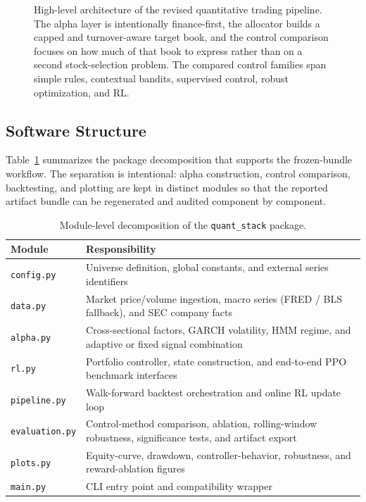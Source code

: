 \documentclass[10pt,twocolumn]{article}
\begin{document}
\begin{figure}[t]
\caption{High-level architecture of the revised quantitative trading pipeline.
The alpha layer is intentionally finance-first, the allocator builds a capped
and turnover-aware target book, and the control comparison focuses on how much
of that book to express rather than on a second stock-selection problem. The
compared control families span simple rules, contextual bandits, supervised
control, robust optimization, and RL.}
\label{fig:architecture}
\end{figure}

\subsection{Software Structure}

Table~\ref{tab:modules} summarizes the package decomposition that supports the
frozen-bundle workflow. The separation is intentional: alpha construction,
control comparison, backtesting, and plotting are kept in distinct modules so
that the reported artifact bundle can be regenerated and audited component by
component.

\begin{table}[t]
\centering
\caption{Module-level decomposition of the \texttt{quant\_stack} package.}
\label{tab:modules}
\small
\begin{tabular}{@{} l p{} @{}}
\toprule
\textbf{Module} & \textbf{Responsibility} \\
\midrule
\texttt{config.py}   & Universe definition, global constants, and external series identifiers \\
\texttt{data.py}     & Market price/volume ingestion, macro series (FRED / BLS fallback), and SEC company facts \\
\texttt{alpha.py}    & Cross-sectional factors, GARCH volatility, HMM regime, and adaptive or fixed signal combination \\
\texttt{rl.py}       & Portfolio controller, state construction, and end-to-end PPO benchmark interfaces \\
\texttt{pipeline.py} & Walk-forward backtest orchestration and online RL update loop \\
\texttt{evaluation.py} & Control-method comparison, ablation, rolling-window robustness, significance tests, and artifact export \\
\texttt{plots.py}    & Equity-curve, drawdown, controller-behavior, robustness, and reward-ablation figures \\
\texttt{main.py}     & CLI entry point and compatibility wrapper \\
\bottomrule
\end{tabular}
\end{table}
\end{document}
